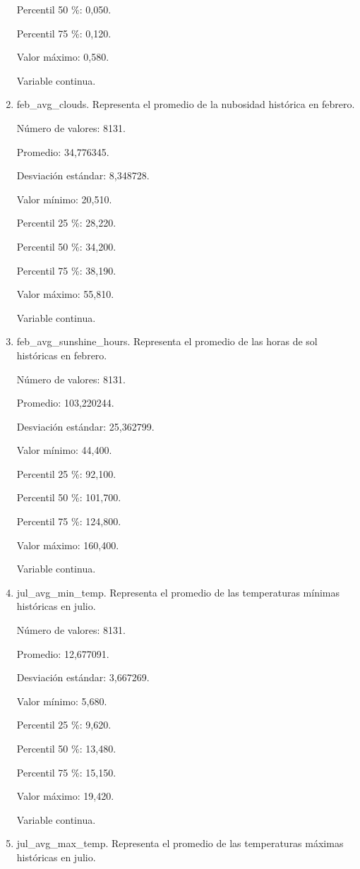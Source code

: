 \begin{enumerate}
	Percentil 50 \%: 0,050.
	
	Percentil 75 \%: 0,120.
	
	Valor máximo: 0,580.
	
	Variable continua.

	\item feb\_avg\_clouds. Representa el promedio de la nubosidad histórica en febrero.
	
	Número de valores: 8131.
	
	Promedio: 34,776345.
	
	Desviación estándar: 8,348728.
	
	Valor mínimo: 20,510.
	
	Percentil 25 \%: 28,220.
	
	Percentil 50 \%: 34,200.
	
	Percentil 75 \%: 38,190.
	
	Valor máximo: 55,810.
	
	Variable continua.

	\item feb\_avg\_sunshine\_hours. Representa el promedio de las horas de sol históricas en febrero.
	
	Número de valores: 8131.
	
	Promedio: 103,220244.
	
	Desviación estándar: 25,362799.
	
	Valor mínimo: 44,400.
	
	Percentil 25 \%: 92,100.
	
	Percentil 50 \%: 101,700.
	
	Percentil 75 \%: 124,800.
	
	Valor máximo: 160,400.
	
	Variable continua.

	\item jul\_avg\_min\_temp. Representa el promedio de las temperaturas mínimas históricas en julio.
	
	Número de valores: 8131.
	
	Promedio: 12,677091.
	
	Desviación estándar: 3,667269.
	
	Valor mínimo: 5,680.
	
	Percentil 25 \%: 9,620.
	
	Percentil 50 \%: 13,480.
	
	Percentil 75 \%: 15,150.
	
	Valor máximo: 19,420.
	
	Variable continua.

	\item jul\_avg\_max\_temp. Representa el promedio de las temperaturas máximas históricas en julio.
	

\end{enumerate}
